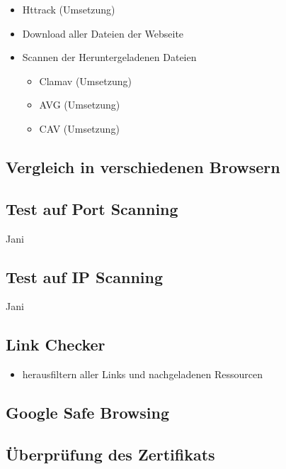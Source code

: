 \begin{itemize}
  \item Httrack (Umsetzung)
  \item Download aller Dateien der Webseite
  \item Scannen der Heruntergeladenen Dateien
  \begin{itemize}
    \item Clamav (Umsetzung)
    \item AVG (Umsetzung)
    \item CAV (Umsetzung)
  \end{itemize}
\end{itemize}

\subsection{Vergleich in verschiedenen Browsern}


\subsection{Test auf Port Scanning}

\todo Jani

\subsection{Test auf IP Scanning}

\todo Jani

\subsection{Link Checker}


\begin{itemize}
  \item herausfiltern aller Links und nachgeladenen Ressourcen
\end{itemize}

\subsection{Google Safe Browsing}


\subsection{Überprüfung des Zertifikats}

